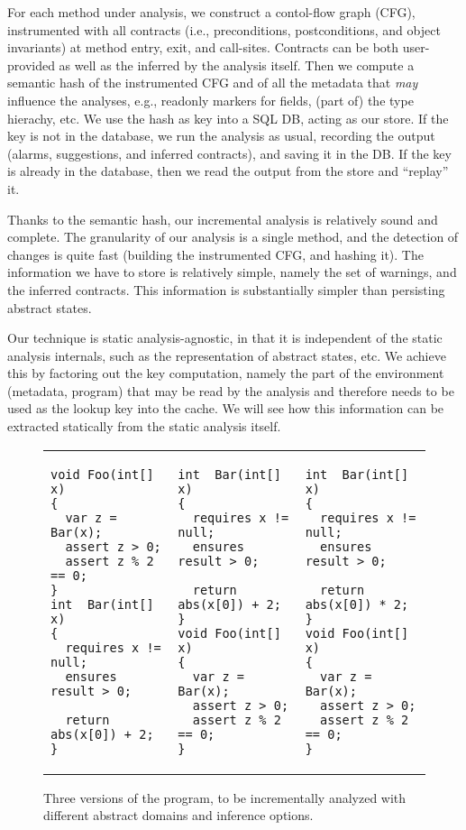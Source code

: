 \documentclass{llncs}
\begin{document}
For each method under analysis, we construct a contol-flow graph (CFG), instrumented with all contracts (i.e., preconditions, postconditions, and object invariants) at method entry, exit, and call-sites.
Contracts can be both user-provided as well as the inferred by the analysis itself.
Then we compute a semantic hash of the instrumented CFG and of all the metadata that \emph{may} influence the analyses, e.g., readonly markers for fields, (part of) the type hierachy, etc.
We use the hash as key into a SQL DB, acting as our  store.
If the key is not in the database, we run the analysis as usual, recording the output (alarms, suggestions, and inferred contracts), and saving it in the  DB.
If the key is already in the database, then we read the output from the store and ``replay'' it.

Thanks to the semantic hash, our incremental analysis is relatively sound and complete.
The granularity of our analysis is a single method, and the detection of changes is quite fast (building the instrumented CFG, and hashing it).
The information we have to store is relatively simple, namely the set of warnings, and the inferred contracts. This information is substantially simpler than persisting abstract states.

Our technique is static analysis-agnostic, in that it is independent of the static analysis internals, such as the representation of abstract states, etc. We achieve this by factoring
out the key computation, namely the part of the environment (metadata, program) that may be read by the analysis and therefore needs to be used as the lookup key into the cache.
We will see how this information can be extracted statically from the static analysis itself.


\begin{figure*}[th]
\lstset{numbers=left, numberstyle=\tiny}
\centering
\begin{tabular}{lll}
\begin{lstlisting}
void Foo(int[] x)
{
  var z = Bar(x);
  assert z > 0;
  assert z % 2 == 0;
}
int  Bar(int[] x)
{
  requires x != null;
  ensures result > 0;

  return abs(x[0]) + 2;
}
\end{lstlisting} & \hspace{.5cm}
\begin{lstlisting}
int  Bar(int[] x)
{
  requires x != null;
  ensures result > 0;

  return abs(x[0]) + 2;
}
void Foo(int[] x)
{
  var z = Bar(x);
  assert z > 0;
  assert z % 2 == 0;
}
\end{lstlisting} & \hspace{.5cm}
\begin{lstlisting}
int  Bar(int[] x)
{
  requires x != null;  
  ensures result > 0;

  return abs(x[0]) * 2;
}
void Foo(int[] x)
{
  var z = Bar(x);
  assert z > 0;
  assert z % 2 == 0;
}
\end{lstlisting}
\end{tabular}
\caption{Three versions of the program, to be incrementally analyzed with different abstract domains and inference options.}
\label{fig:ex1}
\end{figure*}
\end{document}
